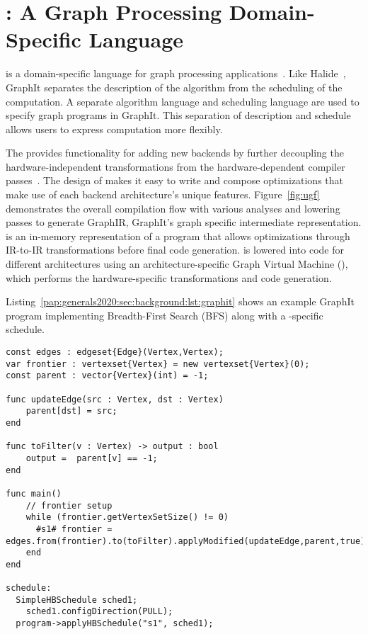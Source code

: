
\section{\graphit: A Graph Processing Domain-Specific Language}\label{pap:generals2020:sec:graphit}
\ugfoverview
\graphit is a domain-specific language for graph processing applications~\citep{zhang2018graphit,brahmakshatriya2021compiling,zhang2019optimizing}.
Like Halide~\citep{ragan2013halide}, GraphIt separates the description of the algorithm from the scheduling of the computation. 
A separate algorithm language and scheduling language are used to specify graph programs in GraphIt. 
This separation of description and schedule allows users to express computation more flexibly.

The \ugc provides functionality for adding new backends by further decoupling the hardware-independent transformations from the hardware-dependent compiler passes~\cite{brahmakshatriya2021taming}.
The design of \ugc makes it easy to write and compose optimizations that make use of each backend architecture's unique features.
Figure~\ref{fig:ugf} demonstrates the overall compilation flow with various analyses and lowering passes to generate GraphIR, GraphIt's graph specific intermediate representation.
\graphisa is an in\hyp{}memory representation of a program that allows optimizations through IR-to-IR transformations before final code generation.
\graphisa is lowered into code for different architectures using an architecture-specific Graph Virtual Machine (\graphvm), which performs the hardware-specific transformations and code generation.

Listing~\ref{pap:generals2020:sec:background:lst:graphit} shows an example GraphIt program implementing Breadth-First Search (BFS) along with a \hb-specific schedule.
\hfill
\break 
\begin{lstlisting}[language=graphit, 
                   caption=GraphIt code for Breadth-First Search (BFS) with a \hbmc schedule.,
                   label=pap:generals2020:sec:background:lst:graphit]
const edges : edgeset{Edge}(Vertex,Vertex);
var frontier : vertexset{Vertex} = new vertexset{Vertex}(0);
const parent : vector{Vertex}(int) = -1;

func updateEdge(src : Vertex, dst : Vertex)
    parent[dst] = src;
end

func toFilter(v : Vertex) -> output : bool
    output =  parent[v] == -1;
end

func main()
    // frontier setup
    while (frontier.getVertexSetSize() != 0)
      #s1# frontier = edges.from(frontier).to(toFilter).applyModified(updateEdge,parent,true);
    end
end

schedule:
  SimpleHBSchedule sched1;
    sched1.configDirection(PULL);
  program->applyHBSchedule("s1", sched1);
\end{lstlisting}

